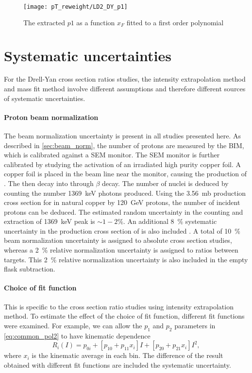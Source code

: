 \documentclass[../main.tex]{subfiles}
\begin{document}
\begin{figure}[h!]
	\centering
	\texttt{[image: pT\_reweight/LD2\_DY\_p1]}
	\caption{The extracted $p1$ as a function $x_F$ fitted to a first order polynomial}
\end{figure}

\section{Systematic uncertainties}
For the Drell-Yan cross section ratios studies, the intensity extrapolation method and mass fit
method involve different assumptions and therefore different sources of systematic uncertainties.
\paragraph{Proton beam normalization}
The beam normalization uncertainty is present in all studies presented here.
As described in \cref{sec:beam_norm}, the number of protons are measured by the BIM, which is
calibrated against a SEM monitor. The SEM monitor is further calibrated by studying the activation of
an irradiated high purity copper foil. A copper foil is placed in the beam line near the monitor,
causing the production of . The  then decay into  through $\beta$
decay. The number of   nuclei is deduced by counting the number \SI{1369}{\keV} photons
produced. Using the \SI{3.56}{\milli\barn} production cross section for  in natural
copper  by \SI{120}{\GeV} protons, the number of incident protons can be deduced. The estimated
random uncertainty in the counting and extraction of \SI{1369}{\keV} peak is $\sim 1-2\%$.
An additional \SI{8}{\percent} systematic uncertainty in the production cross section of 
is also included \cite{docdb-457,docdb-7708}.
A total of \SI{10}{\percent} beam normalization uncertainty is assigned to absolute cross
section studies, whereas a \SI{2}{\percent} relative normalization uncertainty is assigned to ratios between
targets. This \SI{2}{\percent} relative normalization uncertainty is also included in the empty flask
subtraction.

\paragraph{Choice of fit function}
This is specific to the cross section ratio studies using intensity extrapolation method.
To estimate the effect of the choice of fit function, different fit functions were examined.
For example, we can allow the $p_1$ and $p_2$ parameters in \cref{eq:common_pol2} to have kinematic
dependence
\begin{equation}
	R_i \left(I\right) = p_{0i} + \left[p_{10}+p_{11}x_i\right] I + \left[p_{20}+p_{21}x_i\right] I^2,
\end{equation}
where $x_i$ is the kinematic average in each bin. The difference of the result obtained with different fit
functions are included the systematic uncertainty.
\end{document}
